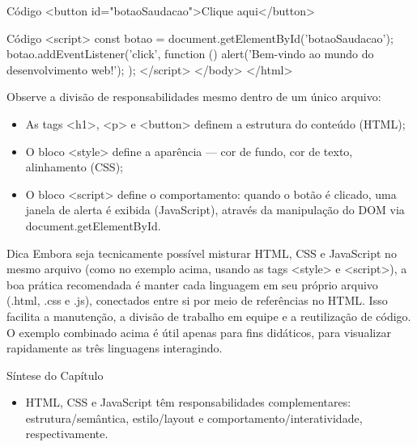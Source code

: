 \begin{codebox}{Código}
<button id="botaoSaudacao">Clique aqui</button>
\end{codebox}

\begin{codebox}{Código}
<script>
const botao = document.getElementById('botaoSaudacao');
botao.addEventListener('click', function () {
alert('Bem-vindo ao mundo do desenvolvimento web!');
});
</script>
</body>
</html>
\end{codebox}

Observe a divisão de responsabilidades mesmo dentro de um único arquivo:

\begin{itemize}
  \item As tags <h1>, <p> e <button> definem a estrutura do conteúdo (HTML);
\end{itemize}

\begin{itemize}
  \item O bloco <style> define a aparência — cor de fundo, cor de texto, alinhamento (CSS);
\end{itemize}

\begin{itemize}
  \item O bloco <script> define o comportamento: quando o botão é clicado, uma janela de alerta é exibida (JavaScript), através da manipulação do DOM via document.getElementById.
\end{itemize}

\begin{codebox}{Dica}
Embora seja tecnicamente possível misturar HTML, CSS e JavaScript no mesmo
arquivo (como no exemplo acima, usando as tags <style> e <script>), a boa
prática recomendada é manter cada linguagem em seu próprio arquivo (.html,
.css e .js), conectados entre si por meio de referências no HTML. Isso facilita a
manutenção, a divisão de trabalho em equipe e a reutilização de código. O exemplo
combinado acima é útil apenas para fins didáticos, para visualizar rapidamente
as três linguagens interagindo.
\end{codebox}

Síntese do Capítulo

\begin{itemize}
  \item HTML, CSS e JavaScript têm responsabilidades complementares: estrutura/semântica, estilo/layout e comportamento/interatividade, respectivamente.
\end{itemize}

